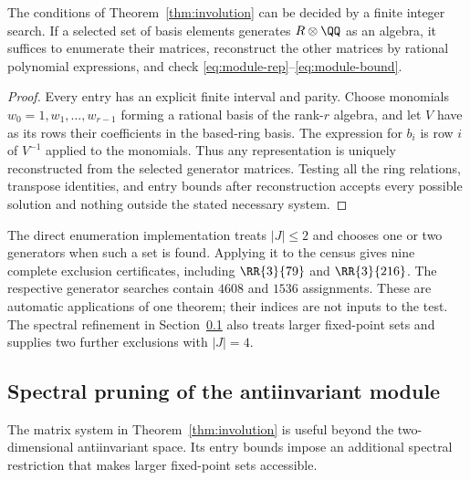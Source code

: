 \begin{proposition}\label{prop:module-enum}
The conditions of Theorem~\ref{thm:involution} can be decided by a finite
integer search. If a selected set of basis elements generates $R\otimes\QQ$
as an algebra, it suffices to enumerate their matrices, reconstruct the
other matrices by rational polynomial expressions, and check
\eqref{eq:module-rep}--\eqref{eq:module-bound}.
\end{proposition}
\begin{proof}
Every entry has an explicit finite interval and parity. Choose monomials
$w_0=1,w_1,\ldots,w_{r-1}$ forming a rational basis of the rank-$r$ algebra,
and let $V$ have as its rows their coefficients in the based-ring basis.
The expression for $b_i$ is row $i$ of $V^{-1}$ applied to the monomials.
Thus any representation is uniquely reconstructed from the selected
generator matrices. Testing all the ring relations, transpose identities,
and entry bounds after reconstruction accepts every possible solution
and nothing outside the stated necessary system.
\end{proof}

The direct enumeration implementation treats $|J|\le2$ and chooses one
or two generators when such a set is found. Applying it to the census
gives nine complete exclusion certificates, including $\RR{3}{79}$ and
$\RR{3}{216}$. The respective generator searches contain $4608$ and
$1536$ assignments. These are automatic applications of one theorem;
their indices are not inputs to the test. The spectral refinement in
Section~\ref{sec:spectral-involution} also treats larger fixed-point sets
and supplies two further exclusions with $|J|=4$.


\subsection{Spectral pruning of the antiinvariant module}
\label{sec:spectral-involution}
The matrix system in Theorem~\ref{thm:involution} is useful beyond the
two-dimensional antiinvariant space. Its entry bounds impose an additional
spectral restriction that makes larger fixed-point sets accessible.

